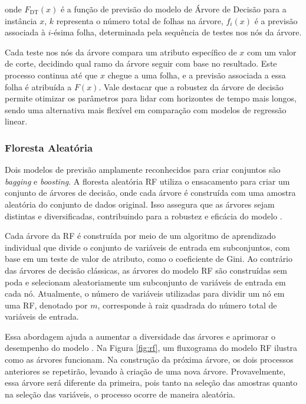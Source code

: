 \noindent onde $ F_{\text{DT}}(x) $ é a função de previsão do modelo de Árvore de Decisão para a instância $ x $, $ k $ representa o número total de folhas na árvore, $ f_i(x) $ é a previsão associada à $ i $-ésima folha, determinada pela sequência de testes nos nós da árvore.

Cada teste nos nós da árvore compara um atributo específico de $ x $ com um valor de corte, decidindo qual ramo da árvore seguir com base no resultado. Este processo continua até que $ x $ chegue a uma folha, e a previsão associada a essa folha é atribuída a $ F(x) $. Vale destacar que a robustez da árvore de decisão permite otimizar os parâmetros para lidar com horizontes de tempo mais longos, sendo uma alternativa mais flexível em comparação com modelos de regressão linear.
 
 
  
 \subsubsection{Floresta Aleat\'oria} \label{subsubsec:rf}
 
Dois modelos de previsão amplamente reconhecidos para criar conjuntos são \textit{bagging} e \textit{boosting}. A floresta aleatória RF utiliza o ensacamento para criar um conjunto de árvores de decisão, onde cada árvore é construída com uma amostra aleatória do conjunto de dados original. Isso assegura que as árvores sejam distintas e diversificadas, contribuindo para a robustez e eficácia do modelo \cite{SEMAN2023109269}.
 
 Cada árvore da RF é construída por meio de um algoritmo de aprendizado individual que divide o conjunto de variáveis de entrada em subconjuntos, com base em um teste de valor de atributo, como o coeficiente de Gini. Ao contrário das árvores de decisão clássicas, as árvores do modelo RF são construídas sem poda e selecionam aleatoriamente um subconjunto de variáveis de entrada em cada nó. Atualmente, o número de variáveis utilizadas para dividir um nó em uma RF, denotado por $m$, corresponde à raiz quadrada do número total de variáveis de entrada. 
 
 Essa abordagem ajuda a aumentar a diversidade das árvores e aprimorar o desempenho do modelo \cite{Pelletier2016156}. Na Figura \ref{fig:rf}, um fluxograma do modelo RF ilustra como as árvores funcionam.
 Na construção da próxima árvore, os dois processos anteriores se repetirão, levando à criação de uma nova árvore. Provavelmente, essa árvore será diferente da primeira, pois tanto na seleção das amostras quanto na seleção das variáveis, o processo ocorre de maneira aleatória.
  
